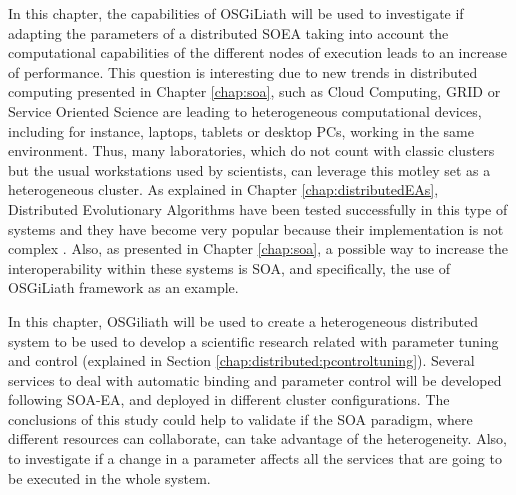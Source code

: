 In this chapter, the capabilities of OSGiLiath will be used to investigate if adapting the parameters of a distributed SOEA taking into account the computational capabilities of the different nodes of execution leads to an increase of performance. This question is interesting due to new trends in distributed computing presented in Chapter \ref{chap:soa}, such as Cloud Computing, GRID
 or Service Oriented Science
 are %
leading to heterogeneous computational devices, including for instance, laptops,
tablets or desktop PCs, working in the same
environment. Thus, many laboratories, which do not count with classic
clusters but the usual workstations used by scientists, can leverage
this motley set as a heterogeneous cluster. As explained in Chapter \ref{chap:distributedEAs}, Distributed Evolutionary
Algorithms have been tested successfully in this type of systems and they have 
become very popular because their implementation is
not complex \cite{AsynchronousMultidemeMerelo08}. %
Also, as presented in Chapter \ref{chap:soa}, a possible way to increase 
the interoperability within these systems is SOA, and specifically, the use of OSGiLiath framework as an example.







In this chapter, OSGiliath will be used %
 to create a heterogeneous distributed system to be used to develop a scientific research related with parameter tuning and control (explained in Section \ref{chap:distributed:pcontroltuning}). Several services to deal with automatic binding and parameter control will be developed following SOA-EA, and deployed in different cluster configurations. The conclusions of this study could help to validate if the SOA paradigm, where different resources can collaborate, can take advantage of the heterogeneity. Also, to investigate if a change in a parameter affects all the services that are going to be executed in the whole system.






